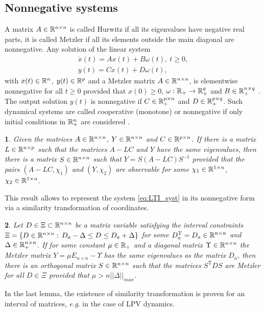 \documentclass[letterpaper, 10 pt, conference]{ieeeconf}
\theoremstyle{plain}
\newtheorem{lem}{\protect\lemmaname}
\theoremstyle{definition}
\theoremstyle{plain}
\theoremstyle{plain}
\theoremstyle{remark}
\providecommand{\lemmaname}{Lemma}
\begin{document}
\subsection{Nonnegative systems}

A matrix $A\in\mathbb{R}^{n\times n}$ is called Hurwitz if all its eigenvalues have negative real parts, it is called Metzler if all its elements outside the main diagonal are nonnegative. Any solution of the linear system
\begin{gather}
\dot{x}(t)=Ax(t)+B\omega(t),\:t\geq0,\label{eq:LTI_syst}\\
y(t)=Cx(t)+D\omega(t),\nonumber 
\end{gather}
with $x(t)\in\mathbb{R}^{n}$, $y(t)\in\mathbb{R}^{p}$ and a Metzler matrix $A\in\mathbb{R}^{n\times n}$, is elementwise nonnegative for all $t\ge0$ provided that $x(0)\ge0$, $\omega:\mathbb{R}_{+}\to\mathbb{R}_{+}^{q}$ and $B\in\mathbb{R}_{+}^{n\times q}$ \cite{FarinaRinaldi2000,Smith95}. The output solution $y(t)$ is nonnegative if $C\in\mathbb{R}_{+}^{p\times n}$ and $D\in\mathbb{R}_{+}^{p\times q}$. Such dynamical systems are called cooperative (monotone) or nonnegative if only initial conditions in $\mathbb{R}_{+}^{n}$ are considered \cite{FarinaRinaldi2000,Smith95}.
\begin{lem}
\label{lem:l2}\textup{\cite{REZ11}} Given the matrices $A\in\mathbb{R}^{n\times n}$, $Y\in\mathbb{R}^{n\times n}$ and \textup{$C\in\mathbb{R}^{p\times n}$. }If there is a matrix \textup{$L\in\mathbb{R}^{n\times p}$} such that the matrices $A-LC$ and $Y$ have the same eigenvalues, then there is a matrix $S\in\mathbb{R}^{n\times n}$ such that $Y=S(A-LC)S^{-1}$ provided that the pairs $(A-LC,\chi_{1})$ and $(Y,\chi_{2})$ are observable for some $\chi_{1}\in\mathbb{R}^{1\times n}$, $\chi_{2}\in\mathbb{R}^{1\times n}$.\textup{ }
\end{lem}
This result allows to represent the system \eqref{eq:LTI_syst} in its nonnegative form via a similarity transformation of coordinates.
\begin{lem}
\label{lem:l3}\textup{\cite{Efimov_a2013}} Let $D\in\Xi\subset\mathbb{R}^{n\times n}$ be a matrix variable satisfying the interval constraints $\Xi=\{D\in\mathbb{R}^{n\times n}:\,D_{a}-\Delta\le D\le D_{a}+\Delta\}$ for some $D_{a}^{\text{T}}=D_{a}\in\mathbb{R}^{n\times n}$ and $\Delta\in\mathbb{R}_{+}^{n\times n}$. If for some constant $\mu\in\mathbb{R}_{+}$ and a diagonal matrix $\Upsilon\in\mathbb{R}^{n\times n}$ the Metzler matrix $Y=\mu E_{n\times n}-\Upsilon$ has the same eigenvalues as the matrix $D_{a}$, then there is an orthogonal matrix $S\in\mathbb{R}^{n\times n}$ such that the matrices $S^{\text{T}}DS$ are Metzler for all $D\in\Xi$ provided that $\mu>n||\Delta||_{max}$.\textup{ }
\end{lem}
In the last lemma, the existence of similarity transformation is proven for an interval of matrices, \emph{e.g}. in the case of LPV dynamics.
\end{document}
